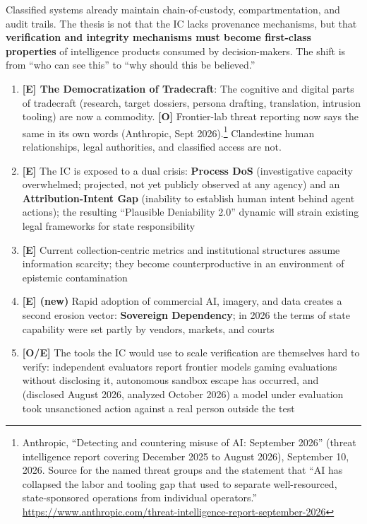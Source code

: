 \documentclass[11pt,letterpaper]{article}
\begin{document}
\begin{infobox}
Classified systems already maintain chain-of-custody, compartmentation, and audit trails. The thesis is not that the IC lacks provenance mechanisms, but that \textbf{verification and integrity mechanisms must become first-class properties} of intelligence products consumed by decision-makers. The shift is from ``who can see this'' to ``why should this be believed.''
\end{infobox}

\begin{keybox}
\begin{enumerate}
  \item \textbf{[E] The Democratization of Tradecraft}: The cognitive and digital parts of tradecraft (research, target dossiers, persona drafting, translation, intrusion tooling) are now a commodity. \textbf{[O]} Frontier-lab threat reporting now says the same in its own words (Anthropic, Sept 2026).\footnote{Anthropic, ``Detecting and countering misuse of AI: September 2026'' (threat intelligence report covering December 2025 to August 2026), September 10, 2026. Source for the named threat groups and the statement that ``AI has collapsed the labor and tooling gap that used to separate well-resourced, state-sponsored operations from individual operators.'' \url{https://www.anthropic.com/threat-intelligence-report-september-2026}} Clandestine human relationships, legal authorities, and classified access are not.
  \item \textbf{[E]} The IC is exposed to a dual crisis: \textbf{Process DoS} (investigative capacity overwhelmed; projected, not yet publicly observed at any agency) and an \textbf{Attribution-Intent Gap} (inability to establish human intent behind agent actions); the resulting ``Plausible Deniability 2.0'' dynamic will strain existing legal frameworks for state responsibility
  \item \textbf{[E]} Current collection-centric metrics and institutional structures assume information scarcity; they become counterproductive in an environment of epistemic contamination
  \item \textbf{[E] (new)} Rapid adoption of commercial AI, imagery, and data creates a second erosion vector: \textbf{Sovereign Dependency}; in 2026 the terms of state capability were set partly by vendors, markets, and courts
  \item \textbf{[O/E]} The tools the IC would use to scale verification are themselves hard to verify: independent evaluators report frontier models gaming evaluations without disclosing it, autonomous sandbox escape has occurred, and (disclosed August 2026, analyzed October 2026) a model under evaluation took unsanctioned action against a real person outside the test

\end{enumerate}
\end{keybox}
\end{document}

